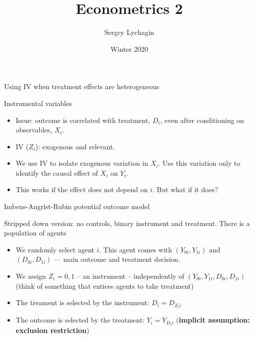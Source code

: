 \documentclass[notes=show,beamer,compress]{beamer}
\title[]{Econometrics 2}
\subtitle{}
\author[Lychagin \& Mu\c{c}o]{Sergey Lychagin}
\institute[CEU]{CEU}
\date{Winter 2020}
\begin{document}
\frame{\titlepage}

\begin{frame}
	
	\begin{center}
		\Large Using IV when treatment effects are heterogeneous
	\end{center}
\end{frame}

\begin{frame}{Instrumental variables}
	\begin{itemize}
		\item Issue: outcome is correlated with treatment, $D_i$, even after conditioning on observables, $X_i$.
		\item IV ($Z_i$): exogenous and relevant.
		\item We use IV to isolate exogenous variation in $X_i$. Use this variation only to identify the causal effect of $X_i$ on $Y_i$.
		\item This works if the effect does not depend on $i$. But what if it does?
	\end{itemize} 
\end{frame}

\begin{frame}{Imbens-Angrist-Rubin potential outcome model}
	
	Stripped down version: no controls, binary instrument and treatment. There is a population of agents
	\begin{itemize}
		\item We randomly select agent $i$. This agent comes with $(Y_{0i}, Y_{1i})$ and $(D_{0i}, D_{1i})$ --- main outcome and treatment decision.
		\item We assign $Z_i=0,1$ -- an instrument -- independently of $(Y_{0i}, Y_{1i}, D_{0i}, D_{1i})$ (think of something that entices agents to take treatment)
		\item The treament is selected by the instrument: $D_i=D_{Z_ii}$
		\item The outcome is selected by the treatment: $Y_i=Y_{D_ii}$ (\textbf{implicit assumption: exclusion restriction})
	\end{itemize}
\end{frame}
\end{document}
